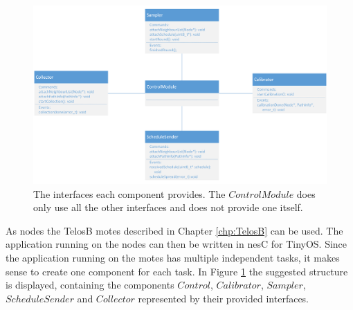 \begin{figure}[htbp]
	\centering
    \includegraphics[scale=0.6]{content/images/Motes/GeneralStructure}
   	\caption{The interfaces each component provides. The $ControlModule$ does only use all the other interfaces and does not provide one itself.}
    \label{fig:moteStructure}
\end{figure}

As nodes the TelosB motes described in Chapter \ref{chp:TelosB} can be used. The application running on the nodes can then be written in nesC for TinyOS. Since the application running on the motes has multiple independent tasks, it makes sense to create one component for each task. In Figure \ref{fig:moteStructure} the suggested structure is displayed, containing the components $Control$, $Calibrator$, $Sampler$, $ScheduleSender$ and $Collector$ represented by their provided interfaces. 

